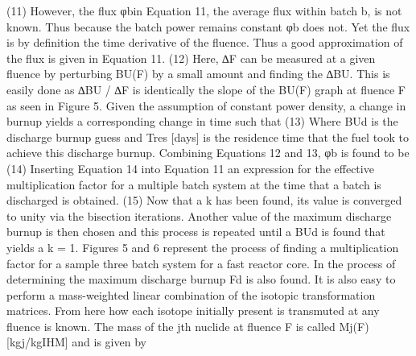                                                 (11)
However, the flux φbin Equation 11, the average flux within batch b, is not known.  Thus because the batch power remains constant φb does not.  Yet the flux is by definition the time derivative of the fluence. Thus a good approximation of the flux is given in Equation 11.
                                                (12)
Here, ∆F can be measured at a given fluence by perturbing BU(F) by a small amount and finding the ∆BU.  This is easily done as ∆BU / ∆F is identically the slope of the BU(F) graph at fluence F as seen in Figure 5.  Given the assumption of constant power density, a change in burnup yields a corresponding change in time such that
                                        (13)
Where BUd is the discharge burnup guess and Tres [days] is the residence time that the fuel took to achieve this discharge burnup. Combining Equations 12 and 13, φb is found to be
                                        (14)
Inserting Equation 14 into Equation 11 an expression for the effective multiplication factor for a multiple batch system at the time that a batch is discharged is obtained.
                        (15)
Now that a k has been found, its value is converged to unity via the bisection iterations.  Another value of the maximum discharge burnup is then chosen and this process is repeated until a BUd is found that yields a k = 1.  Figures 5 and 6 represent the process of finding a multiplication factor for a sample three batch system for a fast reactor core.  
In the process of determining the maximum discharge burnup Fd is also found.  It is also easy to perform a mass-weighted linear combination of the isotopic transformation matrices. From here how each isotope initially present is transmuted at any fluence is known.  The mass of the jth nuclide at fluence F is called Mj(F) [kgj/kgIHM] and is given by

